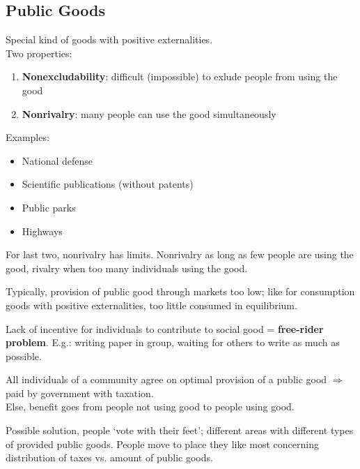 \documentclass[12pt, a4paper, titlepage]{extarticle}
\begin{document}
	\subsection{Public Goods}
	Special kind of goods with positive externalities.\\
	Two properties:
	\begin{enumerate}
		\item \textbf{Nonexcludability}: difficult (impossible) to exlude people from using the good
		\item \textbf{Nonrivalry}: many people can use the good simultaneously
	\end{enumerate}
	Examples:
	\begin{itemize}
		\item National defense
		\item Scientific publications (without patents) 
		\item Public parks
		\item Highways
	\end{itemize}
	For last two, nonrivalry has limits. Nonrivalry as long as few people are using the good, rivalry when too many individuals using the good.
	
	Typically, provision of public good through markets too low; like for consumption goods with positive externalities, too little consumed in equilibrium.
	
	Lack of incentive for individuals to contribute to social good = \textbf{free-rider problem}. E.g.: writing paper in group, waiting for others to write as much as possible.
	
	All individuals of a community agree on optimal provision of a public good $\Rightarrow$ paid by government with taxation.\\
	Else, benefit goes from people not using good to people using good.
	
	Possible solution, people `vote with their feet'; different areas with different types of provided public goods. People move to place they like most concerning distribution of taxes vs. amount of public goods.
	
	\pagebreak
\end{document}
